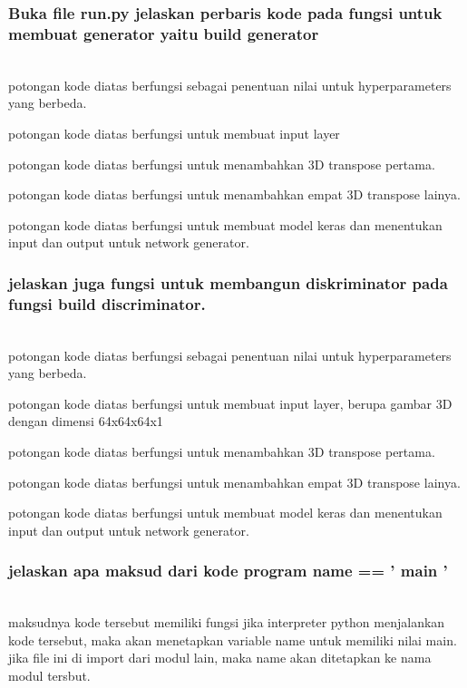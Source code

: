 \subsubsection{Buka file run.py jelaskan perbaris kode pada fungsi untuk membuat generator yaitu build generator}
\hfill\\

potongan kode diatas berfungsi sebagai penentuan nilai untuk hyperparameters yang berbeda.

potongan kode diatas berfungsi untuk membuat input layer

potongan kode diatas berfungsi untuk menambahkan 3D transpose pertama.

potongan kode diatas berfungsi untuk menambahkan empat 3D transpose lainya.

potongan kode diatas berfungsi untuk membuat model keras dan menentukan input dan output untuk network generator.

\subsubsection{jelaskan juga fungsi untuk membangun diskriminator pada fungsi build discriminator.}
\hfill\\

potongan kode diatas berfungsi sebagai penentuan nilai untuk hyperparameters yang berbeda.

potongan kode diatas berfungsi untuk membuat input layer, berupa gambar 3D dengan dimensi 64x64x64x1

potongan kode diatas berfungsi untuk menambahkan 3D transpose pertama.

potongan kode diatas berfungsi untuk menambahkan empat 3D transpose lainya.

potongan kode diatas berfungsi untuk membuat model keras dan menentukan input dan output untuk network generator.

\subsubsection{jelaskan apa maksud dari kode program name == ' main '}
\hfill\\

maksudnya kode tersebut memiliki fungsi jika interpreter python menjalankan kode tersebut,  maka akan menetapkan variable name untuk memiliki nilai main. jika file ini di import dari modul lain, maka name akan ditetapkan ke nama modul tersbut.

